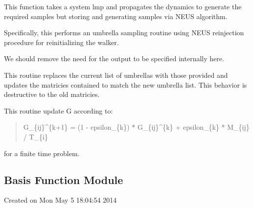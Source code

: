 \documentclass[letterpaper,10pt,english]{sphinxmanual}
\begin{document}
\begin{fulllineitems}
\begin{fulllineitems}
\label{applications/applications.doc:partition.partition.sample}
This function takes a system lmp and propagates the dynamics to generate
the required samples but storing and generating samples via NEUS algorithm.

Specifically, this performs an umbrella sampling routine using NEUS reinjection procedure for reinitializing the walker.

We should remove the need for the output to be specified internally here.

\end{fulllineitems}


\begin{fulllineitems}
\label{applications/applications.doc:partition.partition.set_umbrellas}
This routine replaces the current list of umbrellas with those provided
and updates the matricies contained to match the new umbrella list. This 
behavior is destructive to the old matricies.

\end{fulllineitems}


\begin{fulllineitems}
\label{applications/applications.doc:partition.partition.updateF}
This routine update G according to:
\begin{quote}

G\_\{ij\}\textasciicircum{}\{k+1\} = (1 - epsilon\_\{k\}) * G\_\{ij\}\textasciicircum{}\{k\} + epsilon\_\{k\} * M\_\{ij\} / T\_\{i\}
\end{quote}

for a finite time problem.

\end{fulllineitems}


\end{fulllineitems}



\subsection{Basis Function Module}
\label{applications/applications.doc:module-basisFunctions}\label{applications/applications.doc:basis-function-module}
Created on Mon May  5 18:04:54 2014
\end{document}
